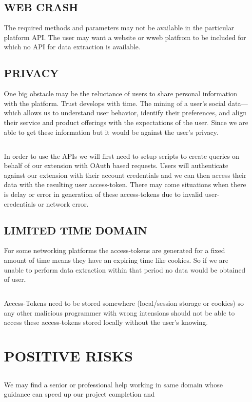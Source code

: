 \documentclass[12pt]{article}
\begin{document}
\subsection{WEB CRASH}
The required methods and parameters may not be available in the particular platform API. The user may want a website or wweb platfrom to be included for which no API for data extraction is available.
\subsection{PRIVACY}
One big obstacle may be the reluctance of users to share personal information with the platform. Trust develops with time. The mining of a user’s social data—which allows us to understand user behavior, identify their preferences, and align their service and product offerings with the expectations of the user. Since we are able to get these information but it would be against the user's privacy.

\subsection{}
In order to use the APIs we will first need to setup scripts to create queries on behalf of our extension with OAuth based requests. Users will authenticate against our extension with their account credentials and we can then access their data with the resulting user access-token. There may come situations when there is delay or error in generation of these access-tokens due to invalid user-credentials or network error.

\subsection{LIMITED TIME DOMAIN}
For some networking platforms the access-tokens are generated for a fixed amount of time means they have an expiring time like cookies. So if we are unable to perform data extraction within that period no data would be obtained of user.

\subsection{}
Access-Tokens need to be stored somewhere (local/session storage or cookies) so any other malicious programmer with wrong intensions should not be able to access these access-tokens stored locally without the user's knowing.

\section{POSITIVE RISKS}
\subsection{}
We may find a senior or professional help working in same domain whose guidance can speed up our project completion and 
\subsection{}
\end{document}
